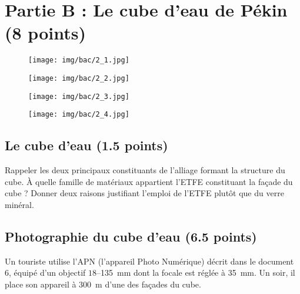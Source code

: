 \documentclass[answers]{exam}
\begin{document}
\section*{Partie B : Le cube d'eau de Pékin (8 points)}

\begin{figure}[H]
  \centering
  \texttt{[image: img/bac/2\_1.jpg]}
\end{figure}

\begin{figure}[H]
  \centering
  \texttt{[image: img/bac/2\_2.jpg]}
\end{figure}

\begin{figure}[H]
  \centering
  \texttt{[image: img/bac/2\_3.jpg]}
\end{figure}

\begin{figure}[H]
  \centering
  \texttt{[image: img/bac/2\_4.jpg]}
\end{figure}

\subsection*{Le cube d'eau (1.5 points)}

\begin{questions}
  \question[0.5] Rappeler les deux principaux constituants de l'alliage formant la structure du cube.
  \question[0.5] À quelle famille de matériaux appartient l'ETFE constituant la façade du cube ?
  \question[0.5] Donner deux raisons justifiant l'emploi de l'ETFE plutôt que du verre minéral.
\end{questions}

\subsection*{Photographie du cube d'eau (6.5 points)}

Un touriste utilise l'APN (l'appareil Photo Numérique) décrit dans le document 6, équipé d'un objectif $18$–\SI{135}{mm} dont la focale est réglée à \SI{35}{mm}. Un soir, il place son appareil à \SI{300}{m} d'une des façades du cube.  
\end{document}
